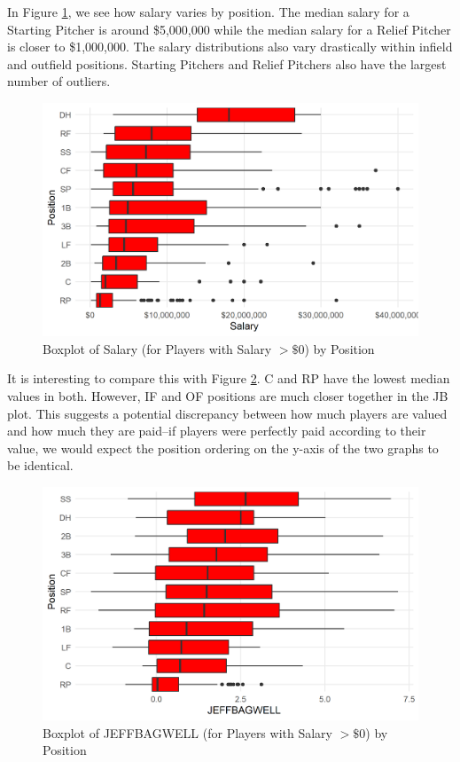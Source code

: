 \documentclass{article}
\begin{document}
In Figure \ref{fig:salary_position_boxplot}, we see how salary varies by position. The median salary for a Starting Pitcher is around \$5,000,000 while the median salary for a Relief Pitcher is closer to \$1,000,000. The salary distributions also vary drastically within infield and outfield positions. Starting Pitchers and Relief Pitchers also have the largest number of outliers.

\begin{figure}[H]
\caption{Boxplot of Salary (for Players with Salary $> \$0$) by Position}
\label{fig:salary_position_boxplot}
\centering
\includegraphics[width=0.7\paperwidth, scale=1.25]{salary_position_boxplots.png}
\end{figure}

It is interesting to compare this with Figure \ref{fig:war_position_boxplot}. C and RP have the lowest median values in both. However, IF and OF positions are much closer together in the JB plot. This suggests a potential discrepancy between how much players are valued and how much they are paid--if players were perfectly paid according to their value, we would expect the position ordering on the y-axis of the two graphs to be identical.  

\begin{figure}[H]
\caption{Boxplot of JEFFBAGWELL (for Players with Salary $> \$0$) by Position}
\label{fig:war_position_boxplot}
\centering
\includegraphics[width=0.7\paperwidth, scale=1.25]{war_position_boxplots.png}
\end{figure}
\end{document}
